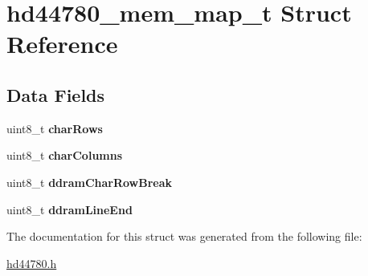 \hypertarget{structhd44780__mem__map__t}{\section{hd44780\-\_\-mem\-\_\-map\-\_\-t \-Struct \-Reference}
\label{structhd44780__mem__map__t}
}
\subsection*{\-Data \-Fields}
\begin{DoxyCompactItemize}
\item 
\hypertarget{structhd44780__mem__map__t_ac7baaed2a967a565114ae374d73392f9}{uint8\-\_\-t {\bfseries char\-Rows}}\label{structhd44780__mem__map__t_ac7baaed2a967a565114ae374d73392f9}

\item 
\hypertarget{structhd44780__mem__map__t_a73d5893db5fb7e0fe77a3877ed96f895}{uint8\-\_\-t {\bfseries char\-Columns}}\label{structhd44780__mem__map__t_a73d5893db5fb7e0fe77a3877ed96f895}

\item 
\hypertarget{structhd44780__mem__map__t_a67f4c93d7f8f774e5181a3929a194cb4}{uint8\-\_\-t {\bfseries ddram\-Char\-Row\-Break}}\label{structhd44780__mem__map__t_a67f4c93d7f8f774e5181a3929a194cb4}

\item 
\hypertarget{structhd44780__mem__map__t_a2e9845fa80a9db5f4cc0d201e839e45f}{uint8\-\_\-t {\bfseries ddram\-Line\-End}}\label{structhd44780__mem__map__t_a2e9845fa80a9db5f4cc0d201e839e45f}

\end{DoxyCompactItemize}


\-The documentation for this struct was generated from the following file\-:\begin{DoxyCompactItemize}
\item 
\hyperlink{hd44780_8h}{hd44780.\-h}\end{DoxyCompactItemize}
